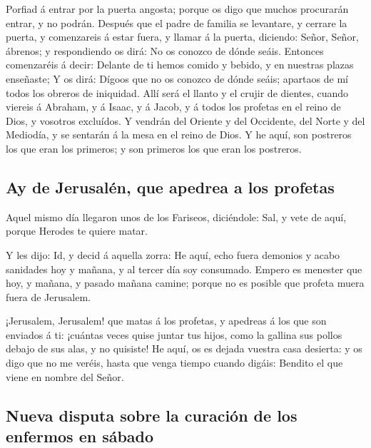  Porfiad á entrar por la puerta angosta; porque os digo
que muchos procurarán entrar, y no podrán.  Después que
el padre de familia se levantare, y cerrare la puerta, y comenzareis á
estar fuera, y llamar á la puerta, diciendo: Señor, Señor, ábrenos; y
respondiendo os dirá: No os conozco de dónde seáis. 
Entonces comenzaréis á decir: Delante de ti hemos comido y bebido, y en
nuestras plazas enseñaste;  Y os dirá: Dígoos que no os
conozco de dónde seáis; apartaos de mí todos los obreros de iniquidad.
 Allí será el llanto y el crujir de dientes, cuando
viereis á Abraham, y á Isaac, y á Jacob, y á todos los profetas en el
reino de Dios, y vosotros excluídos.  Y vendrán del
Oriente y del Occidente, del Norte y del Mediodía, y se sentarán á la
mesa en el reino de Dios.  Y he aquí, son postreros los
que eran los primeros; y son primeros los que eran los postreros.

\hypertarget{ay-de-jerusaluxe9n-que-apedrea-a-los-profetas}{%
\subsection{Ay de Jerusalén, que apedrea a los
profetas}\label{ay-de-jerusaluxe9n-que-apedrea-a-los-profetas}}

 Aquel mismo día llegaron unos de los Fariseos,
diciéndole: Sal, y vete de aquí, porque Herodes te quiere matar.

 Y les dijo: Id, y decid á aquella zorra: He aquí, echo
fuera demonios y acabo sanidades hoy y mañana, y al tercer día soy
consumado.  Empero es menester que hoy, y mañana, y
pasado mañana camine; porque no es posible que profeta muera fuera de
Jerusalem.

 ¡Jerusalem, Jerusalem! que matas á los profetas, y
apedreas á los que son enviados á ti: ¡cuántas veces quise juntar tus
hijos, como la gallina sus pollos debajo de sus alas, y no quisiste!
 He aquí, os es dejada vuestra casa desierta: y os digo
que no me veréis, hasta que venga tiempo cuando digáis: Bendito el que
viene en nombre del Señor.

\hypertarget{nueva-disputa-sobre-la-curaciuxf3n-de-los-enfermos-en-suxe1bado}{%
\subsection{Nueva disputa sobre la curación de los enfermos en
sábado}\label{nueva-disputa-sobre-la-curaciuxf3n-de-los-enfermos-en-suxe1bado}}

